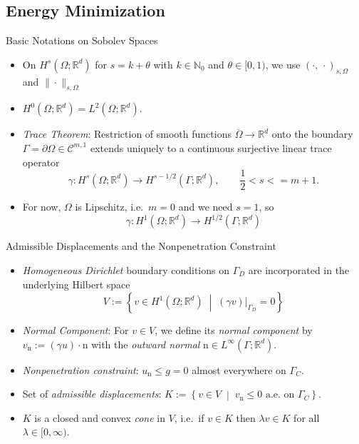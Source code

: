 \documentclass[10pt,aspectratio=169]{beamer}
\def\N{{\mathbb N}}
\def\R{{\mathbb R}}
\def\cC{{\mathcal C}}
\begin{document}
\subsection{Energy Minimization}

\begin{frame}{Basic Notations on Sobolev Spaces}
	\begin{itemize}
		\item On $H^s(\Omega;\R^d)$ for $s =k+\theta$ with $k\in \N_0$ and $\theta\in[0,1)$, we use $(\cdot,\,\cdot)_{s,\Omega}$ and $\|\cdot\|_{s,\Omega}$
		\item $H^0(\Omega;\R^d) = L^2(\Omega;\R^d)$.
		\item {\em Trace Theorem}: Restriction of smooth functions $\overline{\Omega}\to\R^d$ onto the boundary $\Gamma = \partial\Omega\in\cC^{m,1}$ extends uniquely to a continuous surjective linear trace operator
		      \begin{equation*}
			      \gamma: H^s(\Omega;\R^d)\to H^{s-1/2}(\Gamma;\R^d),\qquad \frac{1}{2}<s<=m+1.
		      \end{equation*}
		\item For now, $\Omega$ is Lipschitz, i.e.\ $m=0$ and we need $s = 1$, so
		      \begin{equation*}
			      \gamma: H^1(\Omega;\R^d)\to H^{1/2}(\Gamma;\R^d)
		      \end{equation*}
	\end{itemize}
\end{frame}

\begin{frame}{Admissible Displacements and the Nonpenetration Constraint}
	\begin{itemize}
		\item {\em Homogeneous Dirichlet} boundary conditions on $\Gamma_D$ are incorporated in the underlying Hilbert space
		      \begin{equation*}
			      V:=\left\{ v\in H^1(\Omega;\R^d)\;\middle|\; (\gamma v)|_{\Gamma_D}=0\right\}
		      \end{equation*}
		\item {\em Normal Component}: For $v\in V$, we define its {\em normal component} by $v_\mathrm{n}:= (\gamma u)\cdot \mathrm{n}$ with the {\em outward normal} $\mathrm{n}\in L^\infty(\Gamma;\R^d)$.
		\item {\em Nonpenetration constraint}: $u_\mathrm{n}\le g = 0$ almost everywhere on $\Gamma_C$.
		\item Set of {\em admissible displacements}: $K := \left\{ v\in V\;\middle|\; v_{\mathrm n}\le 0 \text{ a.e.\ on }\Gamma_C\right\}$.
		\item $K$ is a closed and convex {\em cone} in $V$, i.e.\ if $v\in K$ then $\lambda v\in K$ for all $\lambda\in [0,\infty)$.
	\end{itemize}
	\begin{figure}[!h]
		\centering
		
	\end{figure}
\end{frame}
\end{document}
